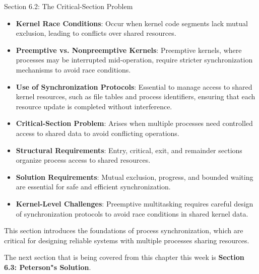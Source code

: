 \begin{notes}{Section 6.2: The Critical-Section Problem}
\begin{highlight}
        \begin{itemize}
            \item \textbf{Kernel Race Conditions}: Occur when kernel code segments lack mutual exclusion, leading to conflicts over shared resources.
            \item \textbf{Preemptive vs. Nonpreemptive Kernels}: Preemptive kernels, where processes may be interrupted mid-operation, require stricter synchronization mechanisms to avoid race conditions.
            \item \textbf{Use of Synchronization Protocols}: Essential to manage access to shared kernel resources, such as file tables and process identifiers, ensuring that each resource update 
            is completed without interference.
        \end{itemize}
    
    \end{highlight}
    
    \begin{highlight}
    
        \begin{itemize}
            \item \textbf{Critical-Section Problem}: Arises when multiple processes need controlled access to shared data to avoid conflicting operations.
            \item \textbf{Structural Requirements}: Entry, critical, exit, and remainder sections organize process access to shared resources.
            \item \textbf{Solution Requirements}: Mutual exclusion, progress, and bounded waiting are essential for safe and efficient synchronization.
            \item \textbf{Kernel-Level Challenges}: Preemptive multitasking requires careful design of synchronization protocols to avoid race conditions in shared kernel data.
        \end{itemize}
    
    This section introduces the foundations of process synchronization, which are critical for designing reliable systems with multiple processes sharing resources.
    
    \end{highlight}
\end{notes}

The next section that is being covered from this chapter this week is \textbf{Section 6.3: Peterson"s Solution}.

